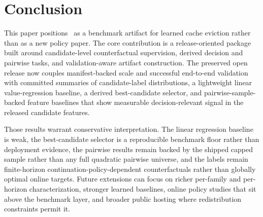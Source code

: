 \section{Conclusion}
\label{sec:conclusion}

This paper positions \lafc\ as a benchmark artifact for learned cache eviction rather than as a new policy paper. The core contribution is a release-oriented package built around candidate-level counterfactual supervision, derived decision and pairwise tasks, and validation-aware artifact construction. The preserved open release now couples manifest-backed scale and successful end-to-end validation with committed summaries of candidate-label distributions, a lightweight linear value-regression baseline, a derived best-candidate selector, and pairwise-sample-backed feature baselines that show measurable decision-relevant signal in the released candidate features.

\begin{sloppypar}
Those results warrant conservative interpretation. The linear regression baseline is weak, the best-candidate selector is a reproducible benchmark floor rather than deployment evidence, the pairwise results remain backed by the shipped capped sample rather than any full quadratic pairwise universe, and the labels remain finite-horizon continuation-policy-dependent counterfactuals rather than globally optimal online targets. Future extensions can focus on richer per-family and per-horizon characterization, stronger learned baselines, online policy studies that sit above the benchmark layer, and broader public hosting where redistribution constraints permit it.
\end{sloppypar}
